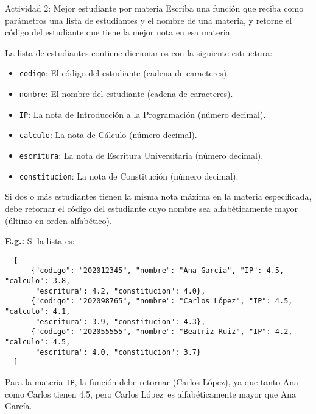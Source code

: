 \documentclass{ip-lab}
\begin{document}
\pagebreak

\begin{sectionbox}{Actividad 2: Mejor estudiante por materia}
  Escriba una función que reciba como parámetros una lista de estudiantes y el nombre de una materia, y retorne el código del estudiante que tiene la mejor nota en esa materia.

  La lista de estudiantes contiene diccionarios con la siguiente estructura:
  \begin{itemize}
      \item \texttt{codigo}: El código del estudiante (cadena de caracteres).
      \item \texttt{nombre}: El nombre del estudiante (cadena de caracteres).
      \item \texttt{IP}: La nota de Introducción a la Programación (número decimal).
      \item \texttt{calculo}: La nota de Cálculo (número decimal).
      \item \texttt{escritura}: La nota de Escritura Universitaria (número decimal).
      \item \texttt{constitucion}: La nota de Constitución (número decimal).
  \end{itemize}

  Si dos o más estudiantes tienen la misma nota máxima en la materia especificada, debe retornar el código del estudiante cuyo nombre sea alfabéticamente mayor (último en orden alfabético).

  \textbf{E.g.:} Si la lista es:
  \begin{verbatim}
  [
      {"codigo": "202012345", "nombre": "Ana García", "IP": 4.5, "calculo": 3.8, 
       "escritura": 4.2, "constitucion": 4.0},
      {"codigo": "202098765", "nombre": "Carlos López", "IP": 4.5, "calculo": 4.1, 
       "escritura": 3.9, "constitucion": 4.3},
      {"codigo": "202055555", "nombre": "Beatriz Ruiz", "IP": 4.2, "calculo": 4.5, 
       "escritura": 4.0, "constitucion": 3.7}
  ]
  \end{verbatim}
  
  Para la materia \texttt{\textquotedbl IP\textquotedbl}, la función debe retornar \texttt{\textquotedbl} (Carlos López), ya que tanto Ana como Carlos tienen 4.5, pero \textquotedbl Carlos López\textquotedbl\ es alfabéticamente mayor que \textquotedbl Ana García\textquotedbl.
\end{sectionbox}
\end{document}
